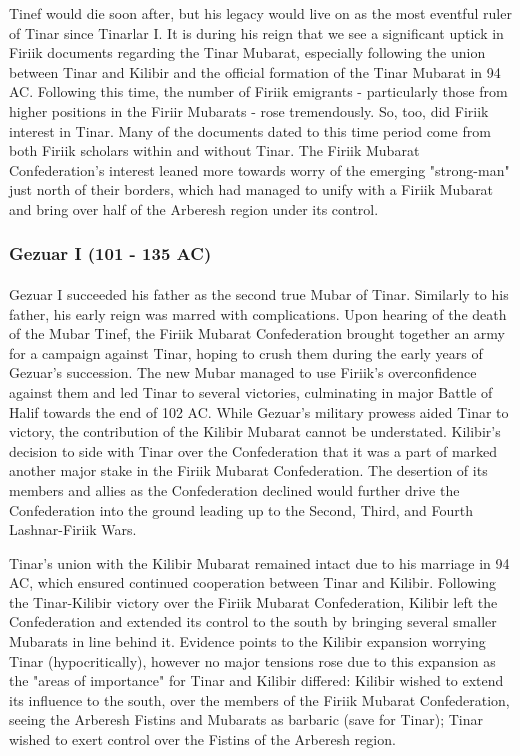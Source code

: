 Tinef would die soon after, but his legacy would live on as the most eventful ruler of Tinar since Tinarlar I. It is during his reign that we see a significant uptick in Firiik documents regarding the Tinar Mubarat, especially following the union between Tinar and Kilibir and the official formation of the Tinar Mubarat in 94 AC. Following this time, the number of Firiik emigrants - particularly those from higher positions in the Firiir Mubarats - rose tremendously. So, too, did Firiik interest in Tinar. Many of the documents dated to this time period come from both Firiik scholars within and without Tinar. The Firiik Mubarat Confederation's interest leaned more towards worry of the emerging "strong-man" just north of their borders, which had managed to unify with a Firiik Mubarat and bring over half of the Arberesh region under its control. 

\subsubsection{Gezuar I (101 - 135 AC)}
\paragraph{}
Gezuar I succeeded his father as the second true Mubar of Tinar. Similarly to his father, his early reign was marred with complications. Upon hearing of the death of the Mubar Tinef, the Firiik Mubarat Confederation brought together an army for a campaign against Tinar, hoping to crush them during the early years of Gezuar's succession. The new Mubar managed to use Firiik's overconfidence against them and led Tinar to several victories, culminating in major Battle of Halif towards the end of 102 AC. While Gezuar's military prowess aided Tinar to victory, the contribution of the Kilibir Mubarat cannot be understated. Kilibir's decision to side with Tinar over the Confederation that it was a part of marked another major stake in the Firiik Mubarat Confederation. The desertion of its members and allies as the Confederation declined would further drive the Confederation into the ground leading up to the Second, Third, and Fourth Lashnar-Firiik Wars.

Tinar's union with the Kilibir Mubarat remained intact due to his marriage in 94 AC, which ensured continued cooperation between Tinar and Kilibir. Following the Tinar-Kilibir victory over the Firiik Mubarat Confederation, Kilibir left the Confederation and extended its control to the south by bringing several smaller Mubarats in line behind it. Evidence points to the Kilibir expansion worrying Tinar (hypocritically), however no major tensions rose due to this expansion as the "areas of importance" for Tinar and Kilibir differed: Kilibir wished to extend its influence to the south, over the members of the Firiik Mubarat Confederation, seeing the Arberesh Fistins and Mubarats as barbaric (save for Tinar); Tinar wished to exert control over the Fistins of the Arberesh region. 

